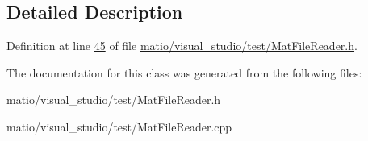 \subsection{Detailed Description}


Definition at line \hyperlink{matio_2visual__studio_2test_2_mat_file_reader_8h_source_l00045}{45} of file \hyperlink{matio_2visual__studio_2test_2_mat_file_reader_8h_source}{matio/visual\+\_\+studio/test/\+Mat\+File\+Reader.\+h}.



The documentation for this class was generated from the following files\+:\begin{DoxyCompactItemize}
\item 
matio/visual\+\_\+studio/test/\+Mat\+File\+Reader.\+h\item 
matio/visual\+\_\+studio/test/\+Mat\+File\+Reader.\+cpp\end{DoxyCompactItemize}
